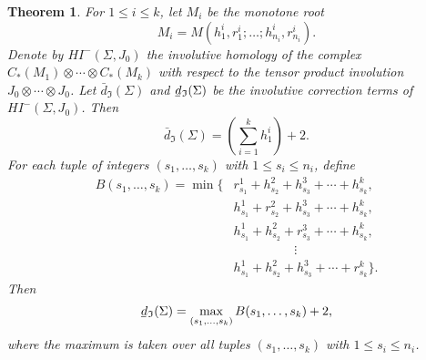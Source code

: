 \documentclass[11 pt]{amsart}
\newtheorem {theorem}{Theorem}[section]
\theoremstyle{remark}
\newcommand{\bunderline}[1]{\underline{#1\mkern-2mu}\mkern2mu }
\def\du {\bar{d}}
\def\dl {\bunderline{d}}
\def\HIm{\mathit{HI}^-}
\def\Inv{\mathfrak{I}}
\begin{document}
\begin{theorem}\label{tensorproduct}
For $1 \leq i \leq k$, let $M_i$ be the monotone root
\[
M_i = M(h_1^i, r_1^i; \ldots; h_{n_i}^i, r_{n_i}^i).
\]
Denote by $\HIm(\Sigma, J_0)$ the involutive homology of the complex $C_*(M_1) \otimes \cdots \otimes C_*(M_k)$ with respect to the tensor product involution $J_0 \otimes \cdots \otimes J_0$. Let $\du_{\Inv}(\Sigma)$ and $\dl_{\Inv}(\Sigma)$ be the involutive correction terms of $\HIm(\Sigma, J_0)$. Then
\[
\du_{\Inv}(\Sigma) = \left(\sum_{i = 1}^k h_1^i\right) + 2.
\]
For each tuple of integers $(s_1, \ldots, s_k)$ with $1 \leq s_i \leq n_i$, define
\begin{align*}
B(s_1, \ldots, s_k) = \min\{ &r_{s_1}^1 + h_{s_2}^2 + h_{s_3}^3 + \cdots + h_{s_k}^k, \\
&h_{s_1}^1 + r_{s_2}^2 + h_{s_3}^3 + \cdots + h_{s_k}^k, \\
&h_{s_1}^1 + h_{s_2}^2 + r_{s_3}^3 + \cdots + h_{s_k}^k, \\
& \hspace{2cm} \vdots \\
&h_{s_1}^1 + h_{s_2}^2 + h_{s_3}^3 + \cdots + r_{s_k}^k\}.
\end{align*}
Then
\[
\dl_{\Inv}(\Sigma) = \max_{(s_1, \ldots, s_k)} B(s_1, \ldots, s_k) + 2,
\]
where the maximum is taken over all tuples $(s_1, \ldots, s_k)$ with $1 \leq s_i \leq n_i$.
\end{theorem}
\end{document}
